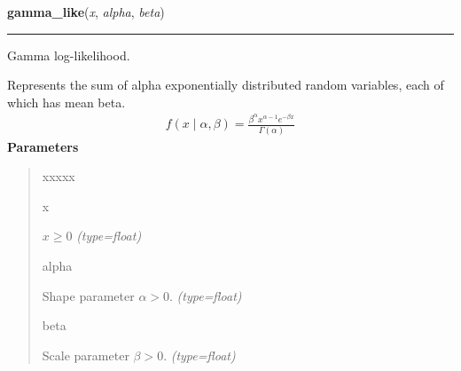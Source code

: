     \vspace{0.5ex}

\hspace{.8\funcindent}\begin{boxedminipage}{\funcwidth}

    \raggedright \textbf{gamma\_like}(\textit{x}, \textit{alpha}, \textit{beta})

    \vspace{-1.5ex}

    \rule{\textwidth}{0.5\fboxrule}
\setlength{\parskip}{2ex}

Gamma log-likelihood.

Represents the sum of alpha exponentially distributed random variables, each
of which has mean beta.
\begin{equation*}\begin{split}f(x \mid \alpha, \beta) = \frac{\beta^{\alpha}x^{\alpha-1}e^{-\beta x}}{\Gamma(\alpha)}\end{split}\end{equation*}\setlength{\parskip}{1ex}
      \textbf{Parameters}
      \vspace{-1ex}

      \begin{quote}
        \begin{Ventry}{xxxxx}

          \item[x]


$x \ge 0$
            {\it (type=float)}

          \item[alpha]


Shape parameter $\alpha > 0$.
            {\it (type=float)}

          \item[beta]


Scale parameter $\beta > 0$.
            {\it (type=float)}

        \end{Ventry}

      \end{quote}

    \end{boxedminipage}

    \label{pymc:distributions:geometric_like}

    \vspace{0.5ex}


